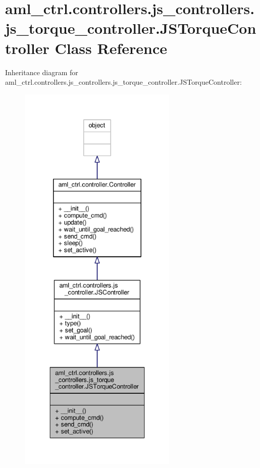\hypertarget{classaml__ctrl_1_1controllers_1_1js__controllers_1_1js__torque__controller_1_1_j_s_torque_controller}{\section{aml\-\_\-ctrl.\-controllers.\-js\-\_\-controllers.\-js\-\_\-torque\-\_\-controller.\-J\-S\-Torque\-Controller Class Reference}
\label{classaml__ctrl_1_1controllers_1_1js__controllers_1_1js__torque__controller_1_1_j_s_torque_controller}
}


Inheritance diagram for aml\-\_\-ctrl.\-controllers.\-js\-\_\-controllers.\-js\-\_\-torque\-\_\-controller.\-J\-S\-Torque\-Controller\-:\nopagebreak
\begin{figure}[H]
\begin{center}
\leavevmode
\includegraphics[height=550pt]{classaml__ctrl_1_1controllers_1_1js__controllers_1_1js__torque__controller_1_1_j_s_torque_controller__inherit__graph}
\end{center}
\end{figure}


